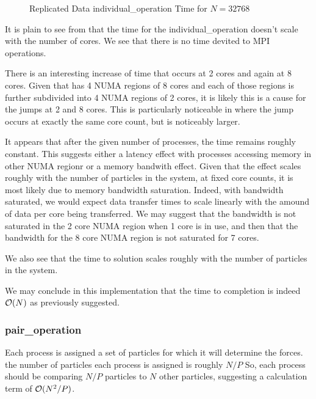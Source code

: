 \begin{figure}
    
    \caption{Replicated Data individual\_operation Time for $N = 32768$}
    \label{fig:v0_replicated_individual_operation_32768_time}
\end  {figure}

It is plain to see from 
that the time for the individual\_operation doesn't scale with the number
of cores.
%
We see that there is no time devited to MPI operations.

There is an interesting increase of time that occurs at 2 cores and again
at 8 cores.
%
Given that \hector{} has 4 NUMA regions of 8 cores and each of those
regions is further subdivided into 4 NUMA regions of 2 cores,
it is likely this is a cause for the jumps at 2 and 8 cores.
%
This is particularly noticeable in
where the jump occurs at exactly the same core count, but is noticeably larger.

It appears that after the given number of processes, the time remains
roughly constant.
%
This suggests either a latency effect with processes accessing memory
in other NUMA regionr or a memory bandwith effect.
%
Given that the effect scales roughly with the number of particles
in the system, at fixed core counts, it is most likely due to
memory bandwidth saturation.
%
Indeed, with bandwidth saturated, we would expect data transfer times
to scale linearly with the amound of data per core being transferred.
%
We may suggest that the bandwidth is not saturated in the 2 core NUMA
region when 1 core is in use, and then that the bandwidth for the 8 core
NUMA region is not saturated for 7 cores.

We also see that the time to solution scales roughly with the number
of particles in the system.

We may conclude in this implementation that the time to completion
is indeed $\mathcal{O}{(N)}$ as previously suggested.


%
%

\subsubsection{pair\_operation}

Each process is assigned a set of particles for which
it will determine the forces.
the number of particles each process is assigned is roughly $N/P$
So, each process should be comparing $N/P$ particles to $N$ other
particles, suggesting a calculation term of $\mathcal{O}{(N^2/P)}$.

